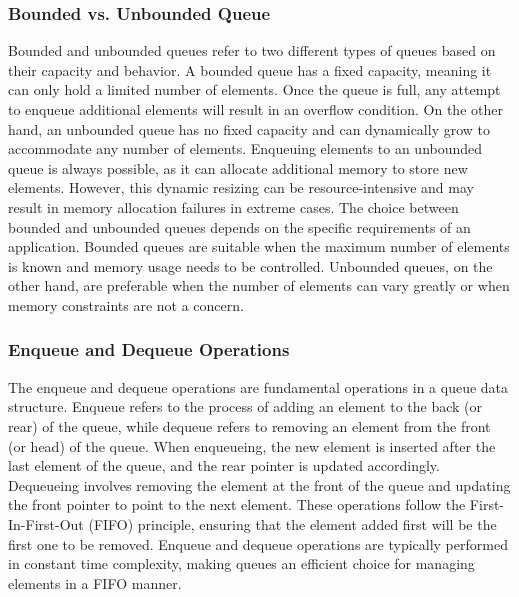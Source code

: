 \subsubsection{Bounded vs. Unbounded Queue}

Bounded and unbounded queues refer to two different types of queues based on their capacity and behavior. A bounded queue has a fixed capacity, meaning it can only hold a limited number of elements. Once the queue is full, any attempt to enqueue additional elements will result in an overflow condition. On the other hand, an unbounded queue has no fixed capacity and can dynamically grow to accommodate 
any number of elements. Enqueuing elements to an unbounded queue is always possible, as it can allocate additional memory to store new elements. However, this dynamic resizing can be resource-intensive and may result in memory allocation failures in extreme cases. The choice between bounded and unbounded queues depends on the specific requirements of an application. Bounded queues are suitable when 
the maximum number of elements is known and memory usage needs to be controlled. Unbounded queues, on the other hand, are preferable when the number of elements can vary greatly or when memory constraints are not a concern.

\subsubsection{Enqueue and Dequeue Operations}

The enqueue and dequeue operations are fundamental operations in a queue data structure. Enqueue refers to the process of adding an element to the back (or rear) of the queue, while dequeue refers to removing an element from the front (or head) of the queue. When enqueueing, the new element is inserted after the last element of the queue, and the rear pointer is updated accordingly. Dequeueing involves 
removing the element at the front of the queue and updating the front pointer to point to the next element. These operations follow the First-In-First-Out (FIFO) principle, ensuring that the element added first will be the first one to be removed. Enqueue and dequeue operations are typically performed in constant time complexity, making queues an efficient choice for managing elements in a FIFO manner.

